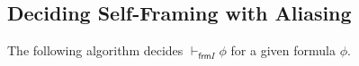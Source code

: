 \documentclass{article}
\newcommand{\tsf}{\textsf}
\newcommand{\frames}{\vDash_I}
\newcommand{\selfframes}{\vdash_{\tsf{frm}I}}
\renewcommand{\empty}{\varnothing}
\begin{document}
\subsection{Deciding Self-Framing with Aliasing}

\noindent
The following algorithm decides $\selfframes \phi$ for a given formula $\phi$.

\end{document}
